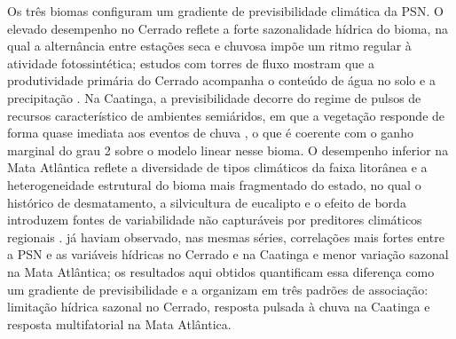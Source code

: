 \documentclass[a4paper,fleqn]{cas-sc}
\begin{document}
Os três biomas configuram um gradiente de previsibilidade climática da PSN. O elevado desempenho no Cerrado reflete a forte sazonalidade hídrica do bioma, na qual a alternância entre estações seca e chuvosa impõe um ritmo regular à atividade fotossintética; estudos com torres de fluxo mostram que a produtividade primária do Cerrado acompanha o conteúdo de água no solo e a precipitação \citep{arruda2016,biudes2021,vourlitis2022}. Na Caatinga, a previsibilidade decorre do regime de pulsos de recursos característico de ambientes semiáridos, em que a vegetação responde de forma quase imediata aos eventos de chuva \citep{schwinning2004,mendes2025,silva2026}, o que é coerente com o ganho marginal do grau 2 sobre o modelo linear nesse bioma. O desempenho inferior na Mata Atlântica reflete a diversidade de tipos climáticos da faixa litorânea \citep{alvares2013} e a heterogeneidade estrutural do bioma mais fragmentado do estado, no qual o histórico de desmatamento, a silvicultura de eucalipto e o efeito de borda introduzem fontes de variabilidade não capturáveis por preditores climáticos regionais \citep{lima2020,broggio2024}. \citet{benfica2023} já haviam observado, nas mesmas séries, correlações mais fortes entre a PSN e as variáveis hídricas no Cerrado e na Caatinga e menor variação sazonal na Mata Atlântica; os resultados aqui obtidos quantificam essa diferença como um gradiente de previsibilidade e a organizam em três padrões de associação: limitação hídrica sazonal no Cerrado, resposta pulsada à chuva na Caatinga e resposta multifatorial na Mata Atlântica.
\end{document}
